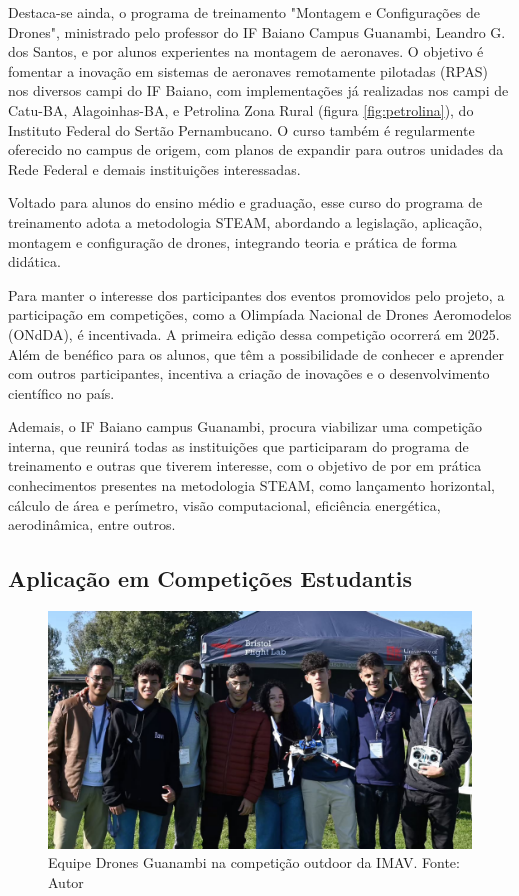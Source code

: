 \documentclass[conference]{IEEEtran}
\begin{document}
 Destaca-se ainda, o programa de treinamento "Montagem e Configurações de Drones", ministrado pelo professor do IF Baiano Campus Guanambi, Leandro G. dos Santos, e por alunos experientes na montagem de aeronaves. O objetivo é fomentar a inovação em sistemas de aeronaves remotamente pilotadas (RPAS) nos diversos campi do IF Baiano, com implementações já realizadas nos campi de Catu-BA, Alagoinhas-BA, e Petrolina Zona Rural (figura \ref{fig:petrolina}), do Instituto Federal do Sertão Pernambucano. O curso também é regularmente oferecido no campus de origem, com planos de expandir para outros unidades da Rede Federal e demais instituições interessadas.

Voltado para alunos do ensino médio e graduação, esse curso do programa de treinamento adota a metodologia STEAM, abordando a legislação, aplicação, montagem e configuração de drones, integrando teoria e prática de forma didática.

Para manter o interesse dos participantes dos eventos promovidos pelo projeto, a participação em competições, como a Olimpíada Nacional de Drones Aeromodelos (ONdDA), é incentivada. A primeira edição dessa competição ocorrerá em 2025. Além de benéfico para os alunos, que têm a possibilidade de conhecer e aprender com outros participantes, incentiva a criação de inovações e o desenvolvimento científico no país. 

Ademais, o IF Baiano campus Guanambi, procura viabilizar uma competição interna, que reunirá todas as instituições que participaram do programa de treinamento e outras que tiverem interesse, com o objetivo de por em prática conhecimentos presentes na metodologia STEAM, como lançamento horizontal, cálculo de área e perímetro, visão computacional, eficiência energética, aerodinâmica, entre outros.

\subsection{Aplicação em Competições Estudantis}

\begin{figure}[!htb]
    \centering
    \includegraphics[scale=0.30]{img/imav2024.png} 
    \caption{Equipe Drones Guanambi na competição outdoor da IMAV. Fonte: Autor}
    \label{fig:imav}
\end{figure}
\end{document}
